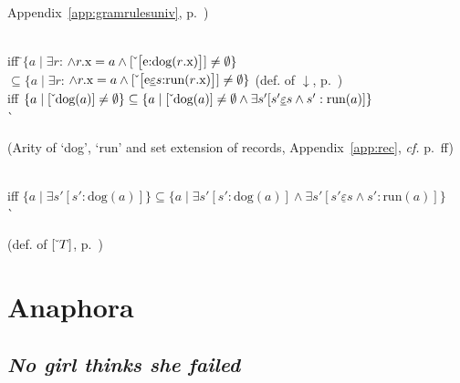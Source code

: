 \begin{ex}
\begin{subex}
\begin{tabbing}
\begin{minipage}{.3\textwidth}
     Appendix~\ref{app:gramrulesuniv}, p.~\pageref{pg:property-restriction})\end{minipage}\\
\> iff \=$\{a\mid\exists r$:
  $\wedge
  r.\text{x}=a\wedge\down{\text{\smallrecord{\smalltfield{e}{dog($r$.x)}}}}\not=\emptyset\}$\\
\>\>$\subseteq\{a\mid\exists r$:
  $\wedge
  r.\text{x}=a\wedge\down{\text{\smallrecord{\smallrfield{e}{$s$}{run($r$.x)}}}}\not=\emptyset\}$
  \hspace*{2em}(def. of $\downarrow$, p.~\pageref{pg:property-extension-rev})
  \\
\> iff
$\{a\mid[\ \!\check{}\ \!\text{dog}(a)]\not=\emptyset\}\subseteq\{a\mid[\ \!\check{}\ \!\text{dog}(a)]\not=\emptyset\wedge\exists
s'[s'\underline{\varepsilon}s\wedge
s':\text{run}(a)]\}$\\
\>\`\begin{minipage}{.3\textwidth}(Arity of `dog', `run' and set
extension of records, Appendix~\ref{app:rec}, \textit{cf.} p.~\pageref{pg:set-reduction-gq}ff)\end{minipage}\\ 
\> iff $\{a\mid\exists s'[s':\text{dog}(a)]\}\subseteq\{a\mid\exists
s'[s':\text{dog}(a)]\wedge\exists
s'[s'\underline{\varepsilon}s\wedge s':\text{run}(a)]\}$ \\
\>\`\begin{minipage}{.3\textwidth}(def. of $[\ \!\check{}\ \!T]$, p.~\pageref{pg:type-extension})\end{minipage}
\end{tabbing} 
\end{subex} 
\label{ex:witnessconds-edr}   
\end{ex} 
  


\section{Anaphora}
\label{sec:anaph}

\subsection{\textit{No girl thinks she failed}}

